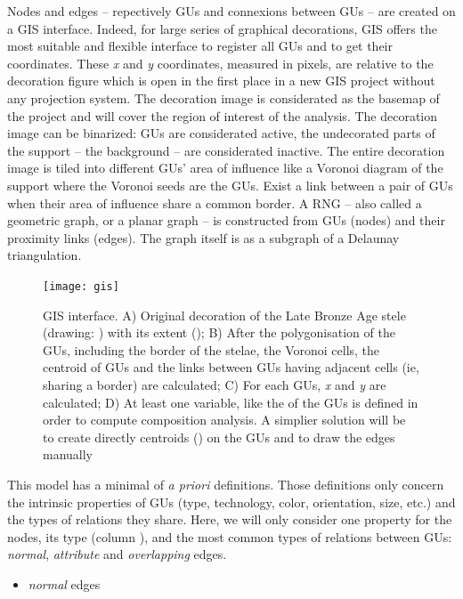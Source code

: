 \documentclass[article]{jss}\usepackage{knitr}
\begin{document}
Nodes and edges -- repectively GUs and connexions between GUs -- are created on a GIS interface. Indeed, for large series of graphical decorations, GIS offers the most suitable and flexible interface to register all GUs and to get their coordinates. These \emph{x} and \emph{y} coordinates, measured in pixels, are relative to the decoration figure which is open in the first place in a new GIS project without any projection system. The decoration image is considerated as the basemap of the project and will cover the region of interest of the analysis. The decoration image can be binarized: GUs are considerated active, the undecorated parts of the support -- the background -- are considerated inactive. The entire decoration image is tiled into different GUs' area of influence like a Voronoi diagram of the support where the Voronoi seeds are the GUs. Exist a link between a pair of GUs when their area of influence share a common border. A RNG -- also called a geometric graph, or a planar graph -- is constructed from GUs (nodes) and their proximity links (edges). The graph itself is as a subgraph of a Delaunay triangulation.


\begin{figure}[H]
\centering
\texttt{[image: gis]}
\caption{\label{fig:gis} GIS interface. A) Original decoration of the Late Bronze Age  stele (drawing: \cite{DiazGuardamino10}) with its extent (); B) After the polygonisation of the GUs, including the border of the stelae, the Voronoi cells, the centroid of GUs and the links between GUs having adjacent cells (ie, sharing a border) are calculated; C) For each GUs, \emph{x} and \emph{y} are calculated; D) At least one variable, like the  of the GUs is defined in order to compute composition analysis. A simplier solution will be to create directly centroids () on the GUs and to draw the edges manually}
\end{figure}

This model has a minimal of \emph{a priori} definitions. Those definitions only concern the intrinsic properties of GUs (type, technology, color, orientation, size, etc.) and the types of relations they share. Here, we will only consider one property for the nodes, its type (column ), and the most common types of relations between GUs: \emph{normal}, \emph{attribute} and \emph{overlapping} edges.

\begin{itemize}
  \item \emph{normal} edges
\end{itemize}
\end{document}
